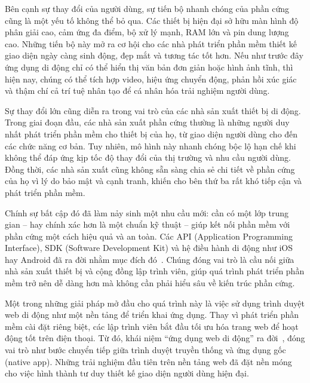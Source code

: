   \begin{flushleft}
    \hspace*{0.8cm}Bên cạnh sự thay đổi của người dùng, sự tiến bộ nhanh chóng của phần cứng cũng là một yếu tố không thể bỏ qua. Các thiết bị hiện đại sở hữu màn hình độ phân giải cao, cảm ứng đa điểm, bộ xử lý mạnh, RAM lớn và pin dung lượng cao. Những tiến bộ này mở ra cơ hội cho các nhà phát triển phần mềm thiết kế giao diện ngày càng sinh động, đẹp mắt và tương tác tốt hơn. Nếu như trước đây ứng dụng di động chỉ có thể hiển thị văn bản đơn giản hoặc hình ảnh tĩnh, thì hiện nay, chúng có thể tích hợp video, hiệu ứng chuyển động, phản hồi xúc giác và thậm chí cả trí tuệ nhân tạo để cá nhân hóa trải nghiệm người dùng.
  \end{flushleft}

  \begin{flushleft}
    \hspace*{0.8cm}Sự thay đổi lớn cũng diễn ra trong vai trò của các nhà sản xuất thiết bị di động. Trong giai đoạn đầu, các nhà sản xuất phần cứng thường là những người duy nhất phát triển phần mềm cho thiết bị của họ, từ giao diện người dùng cho đến các chức năng cơ bản. Tuy nhiên, mô hình này nhanh chóng bộc lộ hạn chế khi không thể đáp ứng kịp tốc độ thay đổi của thị trường và nhu cầu người dùng. Đồng thời, các nhà sản xuất cũng không sẵn sàng chia sẻ chi tiết về phần cứng của họ vì lý do bảo mật và cạnh tranh, khiến cho bên thứ ba rất khó tiếp cận và phát triển phần mềm.
  \end{flushleft}

  \begin{flushleft}
    \hspace*{0.8cm}Chính sự bất cập đó đã làm nảy sinh một nhu cầu mới: cần có một lớp trung gian – hay chính xác hơn là một chuẩn kỹ thuật – giúp kết nối phần mềm với phần cứng một cách hiệu quả và an toàn. Các API (Application Programming Interface), SDK (Software Development Kit) và hệ điều hành di động như iOS hay Android đã ra đời nhằm mục đích đó~\cite{androidsdk}. Chúng đóng vai trò là cầu nối giữa nhà sản xuất thiết bị và cộng đồng lập trình viên, giúp quá trình phát triển phần mềm trở nên dễ dàng hơn mà không cần phải hiểu sâu về kiến trúc phần cứng.
  \end{flushleft}

  \begin{flushleft}
    \hspace*{0.8cm}Một trong những giải pháp mở đầu cho quá trình này là việc sử dụng trình duyệt web di động như một nền tảng để triển khai ứng dụng. Thay vì phát triển phần mềm cài đặt riêng biệt, các lập trình viên bắt đầu tối ưu hóa trang web để hoạt động tốt trên điện thoại. Từ đó, khái niệm “ứng dụng web di động” ra đời~\cite{mobilewebapps}, đóng vai trò như bước chuyển tiếp giữa trình duyệt truyền thống và ứng dụng gốc (native app). Những trải nghiệm đầu tiên trên nền tảng web đã đặt nền móng cho việc hình thành tư duy thiết kế giao diện người dùng hiện đại.
  \end{flushleft}

